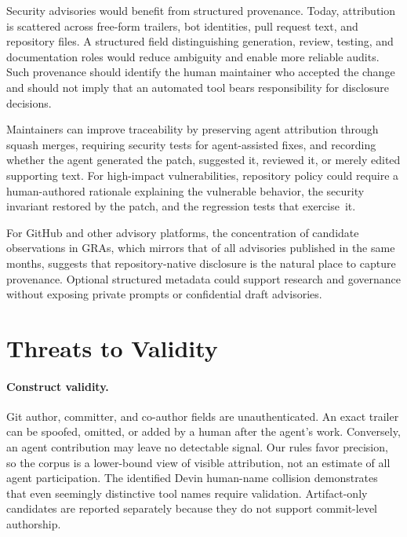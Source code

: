 \documentclass[smallextended,natbib]{svjour3}
\begin{document}
Security advisories would benefit from structured provenance.  Today,
attribution is scattered across free-form trailers, bot identities, pull
request text, and repository files.  A structured field distinguishing
generation, review, testing, and documentation roles would reduce ambiguity
and enable more reliable audits.  Such provenance should identify the human
maintainer who accepted the change and should not imply that an automated tool
bears responsibility for disclosure decisions.

Maintainers can improve traceability by preserving agent attribution through
squash merges, requiring security tests for agent-assisted fixes, and recording
whether the agent generated the patch, suggested it, reviewed it, or merely
edited supporting text.  For high-impact vulnerabilities, repository policy
could require a human-authored rationale explaining the vulnerable behavior,
the security invariant restored by the patch, and the regression tests that
exercise~it.

For GitHub and other advisory platforms, the concentration of candidate
observations in GRAs, which mirrors that of all advisories published in the
same months, suggests that repository-native disclosure is the natural place to
capture provenance.  Optional structured metadata could support
research and governance without exposing private prompts or confidential draft
advisories.

\section{Threats to Validity}
\label{sec:threats}

\paragraph{Construct validity.}
Git author, committer, and co-author fields are unauthenticated.  An exact
trailer can be spoofed, omitted, or added by a human after the agent's work.
Conversely, an agent contribution may leave no detectable signal.  Our rules
favor precision, so the corpus is a lower-bound view of visible attribution,
not an estimate of all agent participation.  The identified Devin human-name
collision demonstrates that even seemingly distinctive tool names require
validation.  Artifact-only candidates are reported separately because they do
not support commit-level authorship.
\end{document}

